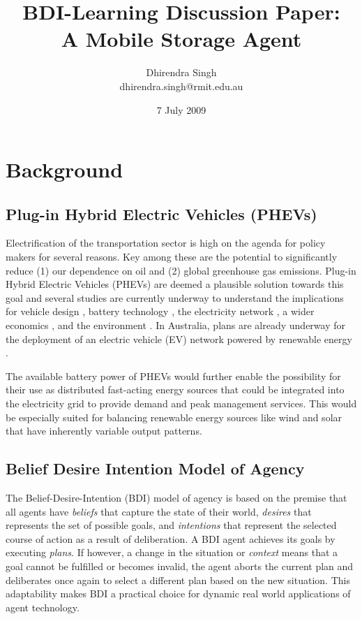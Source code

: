 \documentclass[a4paper]{article}
\title{BDI-Learning Discussion Paper:\\ A Mobile Storage Agent}
\author{
Dhirendra Singh\\ 
dhirendra.singh@rmit.edu.au\\
}
\begin{document}
\date{7 July 2009}

\maketitle

\section{Background}

\subsection{Plug-in Hybrid Electric Vehicles (PHEVs)}
Electrification of the transportation sector is high on the agenda for policy makers for several reasons. Key among these are the potential to significantly reduce (1) our dependence on oil and (2) global greenhouse gas emissions. Plug-in Hybrid Electric Vehicles (PHEVs) are deemed a plausible solution towards this goal and several studies are currently underway to understand the implications for vehicle design \cite{bradley2009desig}, battery technology \cite{burke2007batte}, the electricity network \cite{lund2008integ}, a wider economics \cite{wellinghoff2009the-c}, and the environment \cite{samaras2008life-}. In Australia, plans are already underway for the deployment of an electric vehicle (EV) network powered by renewable energy \cite{release2008bette}. 

The available battery power of PHEVs would further enable the possibility for their use as distributed fast-acting energy sources that could be integrated into the electricity grid to provide demand and peak management services. This would be especially suited for balancing renewable energy sources like wind and solar that have inherently variable output patterns.

\subsection{Belief Desire Intention Model of Agency}

The Belief-Desire-Intention (BDI) \cite{rao1995bdi-a} model of agency is based on the premise that all agents have \textit{beliefs} that capture the state of their world, \textit{desires} that represents the set of possible goals, and \textit{intentions} that represent the selected course of action as a result of deliberation. A BDI agent achieves its goals by executing \textit{plans}. If however, a change in the situation or \emph{context} means that a goal cannot be fulfilled or becomes invalid, the agent aborts the current plan and deliberates once again to select a different plan based on the new situation. This adaptability makes BDI a practical choice for dynamic real world applications of agent technology.
\end{document}
